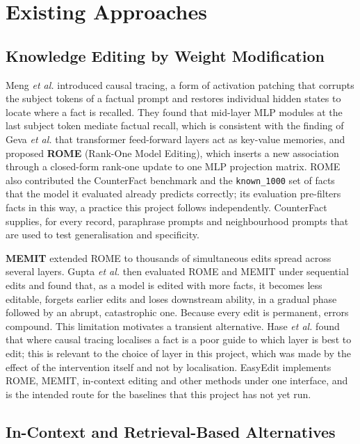 \documentclass[12pt,a4paper]{report}
\begin{document}
\section{Existing Approaches}

\subsection{Knowledge Editing by Weight Modification}

Meng \textit{et al.} \cite{r2} introduced causal tracing, a form of activation patching that corrupts the subject tokens of a factual prompt and restores individual hidden states to locate where a fact is recalled. They found that mid-layer MLP modules at the last subject token mediate factual recall, which is consistent with the finding of Geva \textit{et al.} \cite{r38} that transformer feed-forward layers act as key-value memories, and proposed \textbf{ROME} (Rank-One Model Editing), which inserts a new association through a closed-form rank-one update to one MLP projection matrix. ROME also contributed the CounterFact benchmark and the \texttt{known\_\allowbreak{}1000} set of facts that the model it evaluated already predicts correctly; its evaluation pre-filters facts in this way, a practice this project follows independently. CounterFact supplies, for every record, paraphrase prompts and neighbourhood prompts that are used to test generalisation and specificity.

\textbf{MEMIT} \cite{r3} extended ROME to thousands of simultaneous edits spread across several layers. Gupta \textit{et al.} \cite{r4} then evaluated ROME and MEMIT under sequential edits and found that, as a model is edited with more facts, it becomes less editable, forgets earlier edits and loses downstream ability, in a gradual phase followed by an abrupt, catastrophic one. Because every edit is permanent, errors compound. This limitation motivates a transient alternative. Hase \textit{et al.} \cite{r30} found that where causal tracing localises a fact is a poor guide to which layer is best to edit; this is relevant to the choice of layer in this project, which was made by the effect of the intervention itself and not by localisation. EasyEdit \cite{r32} implements ROME, MEMIT, in-context editing and other methods under one interface, and is the intended route for the baselines that this project has not yet run.

\subsection{In-Context and Retrieval-Based Alternatives}
\end{document}
